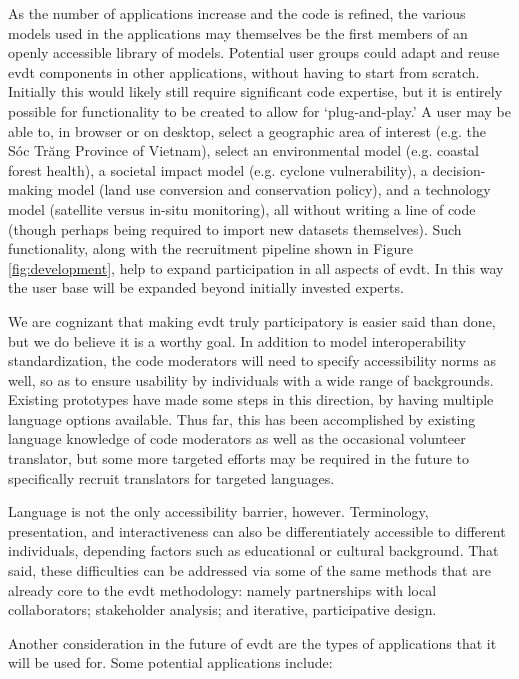 \documentclass[notitlepage]{article}
\begin{document}
\color{black}


As the number of applications increase and the code is refined, the various models used in the applications may themselves be the first members of an openly accessible library of models. Potential user groups could adapt and reuse \ac{evdt} components in other applications, without having to start from scratch. Initially this would likely still require significant code expertise, but it is entirely possible for functionality to be created to allow for `plug-and-play.' A user may be able to, in browser or on desktop, select a geographic area of interest (e.g. the Sóc Trăng Province of Vietnam), select an environmental model (e.g. coastal forest health), a societal impact model (e.g. cyclone vulnerability), a decision-making model (land use conversion and conservation policy), and a technology model (satellite versus in-situ monitoring), all without writing a line of code (though perhaps being required to import new datasets themselves). Such functionality, along with the recruitment pipeline shown in Figure \ref{fig:development}, help to expand participation in all aspects of \ac{evdt}. In this way the user base will be expanded beyond initially invested experts.

We are cognizant that making \ac{evdt} truly participatory is easier said than done, but we do believe it is a worthy goal. In addition to model interoperability standardization, the code moderators will need to specify accessibility norms as well, so as to ensure usability by individuals with a wide range of backgrounds. Existing prototypes have made some steps in this direction, by having multiple language options available. Thus far, this has been accomplished by existing language knowledge of code moderators as well as the occasional volunteer translator, but some more targeted efforts may be required in the future to specifically recruit translators for targeted languages.

Language is not the only accessibility barrier, however. Terminology, presentation, and interactiveness can also be differentiately accessible to different individuals, depending factors such as educational or cultural background. That said, these difficulties can be addressed via some of the same methods that are already core to the \ac{evdt} methodology: namely partnerships with local collaborators; stakeholder analysis; and iterative, participative design. 

Another consideration in the future of \ac{evdt} are the types of applications that it will be used for. Some potential applications include:
\end{document}
